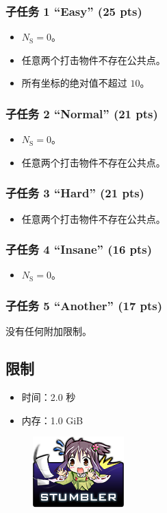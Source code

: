 \documentclass[UTF8, 11pt, a4paper]{article}
\begin{document}
\subsubsection*{子任务 1 “Easy” (25 pts)}
\begin{itemize}
    \item $N_\mathrm{S} = 0$。
    \item 任意两个打击物件不存在公共点。
    \item 所有坐标的绝对值不超过 $10$。
\end{itemize}
\subsubsection*{子任务 2 “Normal” (21 pts)}
\begin{itemize}
    \item $N_\mathrm{S} = 0$。
    \item 任意两个打击物件不存在公共点。
\end{itemize}
\subsubsection*{子任务 3 “Hard” (21 pts)}
\begin{itemize}
    \item 任意两个打击物件不存在公共点。
\end{itemize}
\subsubsection*{子任务 4 “Insane” (16 pts)}
\begin{itemize}
    \item $N_\mathrm{S} = 0$。
\end{itemize}
\subsubsection*{子任务 5 “Another” (17 pts)}
    没有任何附加限制。

\subsection*{限制}
\begin{itemize}
\item 时间：2.0 秒
\item 内存：1.0 GiB
\end{itemize}

\begin{figure}[h]\centering
\includegraphics[scale=0.55]{stumbler.png}
\end{figure}
\end{document}
